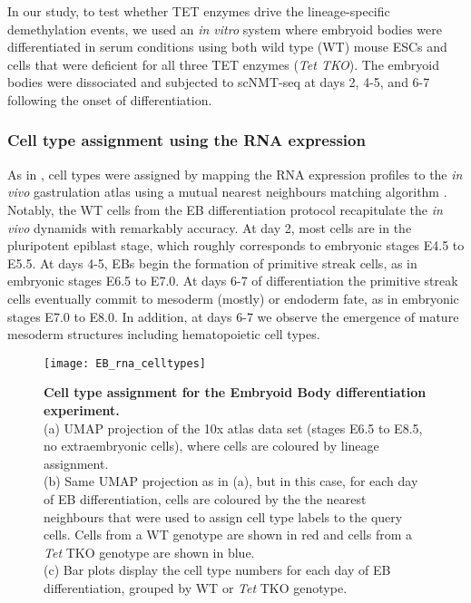 In our study, to test whether TET enzymes drive the lineage-specific demethylation events, we used an \textit{in vitro} system where embryoid bodies were differentiated in serum conditions using both wild type (WT) mouse ESCs and cells that were deficient for all three TET enzymes (\textit{Tet TKO}). The embryoid bodies were dissociated and subjected to scNMT-seq at days 2, 4-5, and 6-7 following the onset of differentiation.

\subsubsection{Cell type assignment using the RNA expression}
As in , cell types were assigned by mapping the RNA expression profiles to the \textit{in vivo} gastrulation atlas using a mutual nearest neighbours matching algorithm \cite{Haghverdi2018}.\\
Notably, the WT cells from the EB differentiation protocol recapitulate the \textit{in vivo} dynamids with remarkably accuracy. At day 2, most cells are in the pluripotent epiblast stage, which roughly corresponds to embryonic stages E4.5 to E5.5. At days 4-5, EBs begin the formation of primitive streak cells, as in embryonic stages E6.5 to E7.0. At days 6-7 of differentiation the primitive streak cells eventually commit to mesoderm (mostly) or endoderm fate, as in embryonic stages E7.0 to E8.0. In addition, at days 6-7 we observe the emergence of mature mesoderm structures including hematopoietic cell types.

\begin{figure}[H]
	\centering
	\texttt{[image: EB\_rna\_celltypes]}
	\caption[]{
		\textbf{Cell type assignment for the Embryoid Body differentiation experiment.} \\
		(a) UMAP projection of the 10x atlas data set (stages E6.5 to E8.5, no extraembryonic cells), where cells are coloured by lineage assignment.\\
		(b) Same UMAP projection as in (a), but in this case, for each day of EB differentiation, cells are coloured by the the nearest neighbours that were used to assign cell type labels to the query cells. Cells from a WT genotype are shown in red and cells from a \textit{Tet} TKO genotype are shown in blue.\\
		(c) Bar plots display the cell type numbers for each day of EB differentiation, grouped by WT or \textit{Tet} TKO genotype. }
	\label{fig:EB_rna_celltypes}
\end{figure}

